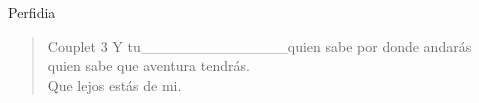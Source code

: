 \begin{song}[bolero]{Perfidia}
\begin{verse}{Couplet 3}
Y\hspace{1em} tu\_{}\_{}\_{}\_{}\_{}\_{}\_{}\_{}\_{}\_{}\_{}\_{}\_{}\_{}quien sabe por donde andar\'{a}s \hspace{3em}\\
quien sabe que aventura tendr\'{a}s.\\
Que lejos est\'{a}s de mi. \hspace{3em} \hspace{3em} \hspace{3em}
\end{verse}

\end{song}
